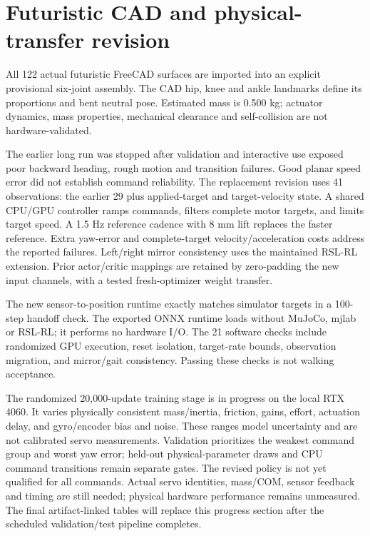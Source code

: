 \section{Futuristic CAD and physical-transfer revision}
All 122 actual futuristic FreeCAD surfaces are imported into an explicit provisional six-joint assembly. The CAD hip, knee and ankle landmarks define its proportions and bent neutral pose. Estimated mass is 0.500 kg; actuator dynamics, mass properties, mechanical clearance and self-collision are not hardware-validated.

The earlier long run was stopped after validation and interactive use exposed poor backward heading, rough motion and transition failures. Good planar speed error did not establish command reliability. The replacement revision uses 41 observations: the earlier 29 plus applied-target and target-velocity state. A shared CPU/GPU controller ramps commands, filters complete motor targets, and limits target speed. A 1.5 Hz reference cadence with 8 mm lift replaces the faster reference. Extra yaw-error and complete-target velocity/acceleration costs address the reported failures. Left/right mirror consistency uses the maintained RSL-RL extension. Prior actor/critic mappings are retained by zero-padding the new input channels, with a tested fresh-optimizer weight transfer.

The new sensor-to-position runtime exactly matches simulator targets in a 100-step handoff check. The exported ONNX runtime loads without MuJoCo, mjlab or RSL-RL; it performs no hardware I/O. The 21 software checks include randomized GPU execution, reset isolation, target-rate bounds, observation migration, and mirror/gait consistency. Passing these checks is not walking acceptance.

The randomized 20,000-update training stage is in progress on the local RTX 4060. It varies physically consistent mass/inertia, friction, gains, effort, actuation delay, and gyro/encoder bias and noise. These ranges model uncertainty and are not calibrated servo measurements. Validation prioritizes the weakest command group and worst yaw error; held-out physical-parameter draws and CPU command transitions remain separate gates. The revised policy is not yet qualified for all commands. Actual servo identities, mass/COM, sensor feedback and timing are still needed; physical hardware performance remains unmeasured. The final artifact-linked tables will replace this progress section after the scheduled validation/test pipeline completes.
